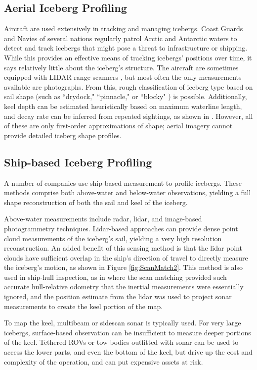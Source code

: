 \subsection{Aerial Iceberg Profiling}

Aircraft are used extensively in tracking and managing icebergs. Coast Guards and Navies of several nations regularly patrol Arctic and Antarctic waters to detect and track icebergs that might pose a threat to infrastructure or shipping. While this provides an effective means of tracking icebergs' positions over time, it says relatively little about the iceberg's structure. The aircraft are sometimes equipped with LIDAR range scanners \cite{Bunkin2012}, but most often the only measurements available are photographs. From this, rough classification of iceberg type based on sail shape (such as ``drydock," ``pinnacle," or ``blocky" ) is possible. Additionally, keel depth can be estimated heuristically based on maximum waterline length, and decay rate can be inferred from repeated sightings, as shown in \cite{Barker2004}. However, all of these are only first-order approximations of shape; aerial imagery cannot provide detailed iceberg shape profiles. 

\subsection{Ship-based Iceberg Profiling}

A number of companies use ship-based measurement to profile icebergs. These methods comprise both above-water and below-water observations, yielding a full shape reconstruction of both the sail and keel of the iceberg. 

Above-water measurements include radar, lidar, and image-based photogrammetry techniques. Lidar-based approaches can provide dense point cloud measurements of the iceberg's sail, yielding a very high resolution reconstruction. An added benefit of this sensing method is that the lidar point clouds have sufficient overlap in the ship's direction of travel to directly measure the iceberg's motion, as shown in Figure \ref{fig:ScanMatch2}. This method is also used in ship-hull inspection, as in \cite{Papadopoulos2014} where the scan matching provided such accurate hull-relative odometry that the inertial measurements were essentially ignored, and the position estimate from the lidar was used to project sonar measurements to create the keel portion of the map.

To map the keel, multibeam or sidescan sonar is typically used. For very large icebergs, surface-based observation can be insufficient to measure deeper portions of the keel. Tethered ROVs or tow bodies outfitted with sonar can be used to access the lower parts, and even the bottom of the keel, but drive up the cost and complexity of the operation, and can put expensive assets at risk. 

